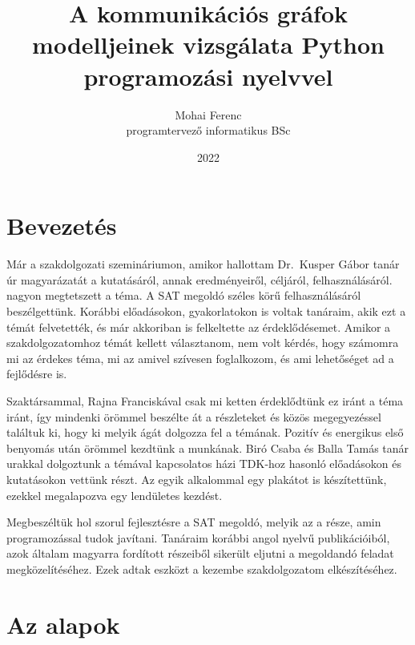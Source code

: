 \documentclass[
]{thesis-ekf}
\theoremstyle{definition}
\theoremstyle{remark}
\begin{document}
	\title{A kommunikációs gráfok modelljeinek vizsgálata Python programozási nyelvvel}
	\author{Mohai Ferenc\\programtervező informatikus BSc}
	\date{2022}
	
	\maketitle
	\tableofcontents
	
\chapter*{Bevezetés}
	Már a szakdolgozati szemináriumon, amikor hallottam Dr.~Kusper Gábor tanár úr magyarázatát a kutatásáról, annak eredményeiről, céljáról, felhasználásáról. nagyon megtetszett a téma.
	A \textsc{SAT} megoldó széles körű felhasználásáról beszélgettünk.
	Korábbi előadásokon, gyakorlatokon is voltak tanáraim, akik ezt a témát felvetették, és már akkoriban is felkeltette az érdeklődésemet.
	Amikor a szakdolgozatomhoz témát kellett választanom, nem volt kérdés, hogy számomra mi az érdekes téma, mi az amivel szívesen foglalkozom, és ami lehetőséget ad a fejlődésre is.

	Szaktársammal, Rajna Franciskával csak mi ketten érdeklődtünk ez iránt a téma iránt, így mindenki örömmel beszélte át a részleteket és közös megegyezéssel találtuk ki, hogy ki melyik ágát dolgozza fel a témának.
	Pozitív és energikus első benyomás után örömmel kezdtünk a munkának. Biró Csaba és Balla Tamás tanár urakkal dolgoztunk a témával kapcsolatos házi TDK-hoz hasonló előadásokon és kutatásokon \cite{am} vettünk részt. Az egyik alkalommal egy plakátot is készítettünk, ezekkel megalapozva egy lendületes kezdést.
	
	Megbeszéltük hol szorul fejlesztésre a \textsc{SAT} megoldó, melyik az a része, amin programozással tudok javítani. Tanáraim korábbi angol nyelvű publikációiból, azok általam magyarra fordított részeiből sikerült eljutni a megoldandó feladat megközelítéséhez. Ezek adtak eszközt a kezembe szakdolgozatom elkészítéséhez.
		
\chapter{Az alapok}
	
\end{document}
